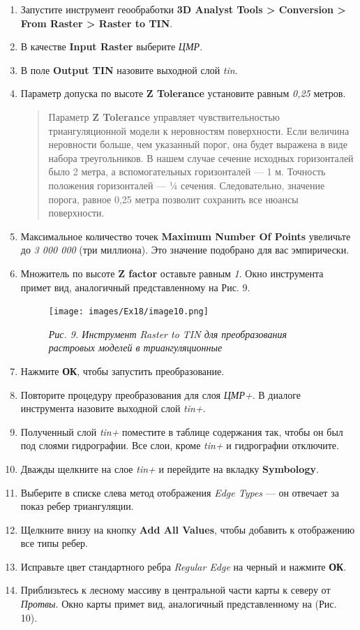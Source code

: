 \documentclass[12pt,]{book}
\begin{document}
\begin{enumerate}
\def\labelenumi{\arabic{enumi}.}
\item
  Запустите инструмент геообработки \textbf{3D Analyst Tools \textgreater{} Conversion \textgreater{} From Raster \textgreater{} Raster to TIN}.
\item
  В качестве \textbf{Input Raster} выберите \emph{ЦМР}.
\item
  В поле \textbf{Output TIN} назовите выходной слой \emph{tin}.
\item
  Параметр допуска по высоте \textbf{Z Tolerance} установите равным \emph{0,25} метров.

  \begin{quote}
  Параметр \textbf{Z Tolerance} управляет чувствительностью триангуляционной модели к неровностям поверхности. Если величина неровности больше, чем указанный порог, она будет выражена в виде набора треугольников. В нашем случае сечение исходных горизонталей было 2 метра, а вспомогательных горизонталей --- 1 м. Точность положения горизонталей --- ¼ сечения. Следовательно, значение порога, равное 0,25 метра позволит сохранить все нюансы поверхности.
  \end{quote}
\item
  Максимальное количество точек \textbf{Maximum Number Of Points} увеличьте до \emph{3 000 000} (три миллиона). Это значение подобрано для вас эмпирически.
\item
  Множитель по высоте \textbf{Z factor} оставьте равным \emph{1}. Окно инструмента примет вид, аналогичный представленному на Рис. 9.

  \begin{figure}
  \centering
  \texttt{[image: images/Ex18/image10.png]}
  \caption{\emph{Рис. 9. Инструмент Raster to TIN для преобразования растровых моделей в триангуляционные}}
  \end{figure}
\item
  Нажмите \textbf{ОК}, чтобы запустить преобразование.
\item
  Повторите процедуру преобразования для слоя \emph{ЦМР+}. В диалоге инструмента назовите выходной слой \emph{tin+}.
\item
  Полученный слой \emph{tin+} поместите в таблице содержания так, чтобы он был под слоями гидрографии. Все слои, кроме \emph{tin+} и гидрографии отключите.
\item
  Дважды щелкните на слое \emph{tin+} и перейдите на вкладку \textbf{Symbology}.
\item
  Выберите в списке слева метод отображения \emph{Edge Types} --- он отвечает за показ ребер триангуляции.
\item
  Щелкните внизу на кнопку \textbf{Add All Values}, чтобы добавить к отображению все типы ребер.
\item
  Исправьте цвет стандартного ребра \emph{Regular Edge} на черный и нажмите \textbf{ОК}.
\item
  Приблизьтесь к лесному массиву в центральной части карты к северу от \emph{Протвы}. Окно карты примет вид, аналогичный представленному на (Рис. 10).


\end{enumerate}
\end{document}
